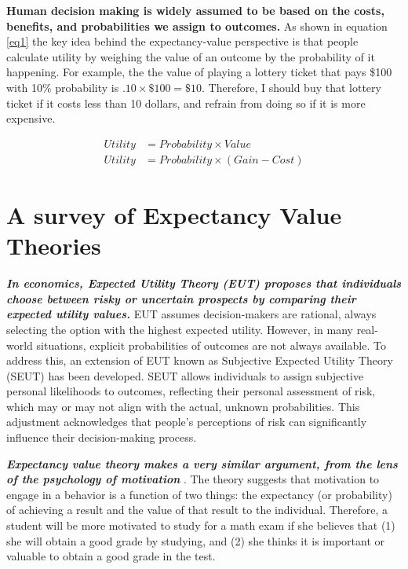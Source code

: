 \documentclass[letterpaper, 12pt]{article}
\begin{document}
\newpage
\textbf{Human decision making is widely assumed to be based on the costs, benefits, and probabilities we assign to outcomes.} As shown in equation \ref{eq1} the key idea behind the expectancy-value perspective is that people calculate utility by weighing the value of an outcome by the probability of it happening. For example, the the value of playing a lottery ticket that pays \$100 with 10\% probability is $.10 \times \$100 = \$10$. Therefore, I should buy that lottery ticket if it costs less than 10 dollars, and refrain from doing so if it is more expensive.

\begin{equation} \label{eq1}
\begin{split}
    Utility &= Probability \times Value \\
    Utility &= Probability \times (Gain - Cost) 
\end{split}
\end{equation}

\section*{A survey of Expectancy Value Theories}

\textbf{\textit{In economics, Expected Utility Theory (EUT) proposes that individuals choose between risky or uncertain prospects by comparing their expected utility values.}} EUT assumes decision-makers are rational, always selecting the option with the highest expected utility. However, in many real-world situations, explicit probabilities of outcomes are not always available. To address this, an extension of EUT known as Subjective Expected Utility Theory (SEUT) has been developed. SEUT allows individuals to assign subjective personal likelihoods to outcomes, reflecting their personal assessment of risk, which may or may not align with the actual, unknown probabilities. This adjustment acknowledges that people's perceptions of risk can significantly influence their decision-making process.

\textbf{\textit{Expectancy value theory makes a very similar argument, from the lens of the psychology of motivation}} \cite{wigfield2000}. The theory suggests that motivation to engage in a behavior is a function of two things: the expectancy (or probability) of achieving a result and the value of that result to the individual. Therefore, a student will be more motivated to study for a math exam if she believes that (1) she will obtain a good grade by studying, and (2) she thinks it is important or valuable to obtain a good grade in the test. 
\end{document}
